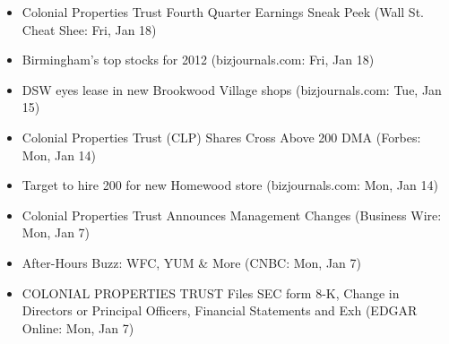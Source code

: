 \documentclass[11pt,asymmetric]{article}
\begin{document}
\begin{itemize}
\item Colonial Properties Trust Fourth Quarter Earnings Sneak Peek (Wall St. Cheat Shee: Fri, Jan 18)
\item Birmingham's top stocks for 2012 (bizjournals.com: Fri, Jan 18)
\item DSW eyes lease in new Brookwood Village shops (bizjournals.com: Tue, Jan 15)
\item Colonial Properties Trust (CLP) Shares Cross Above 200 DMA (Forbes: Mon, Jan 14)
\item Target to hire 200 for new Homewood store (bizjournals.com: Mon, Jan 14)
\item Colonial Properties Trust Announces Management Changes (Business Wire: Mon, Jan 7)
\item After-Hours Buzz: WFC, YUM \& More (CNBC: Mon, Jan 7)
\item COLONIAL PROPERTIES TRUST Files SEC form 8-K, Change in Directors or Principal Officers, Financial Statements and Exh (EDGAR Online: Mon, Jan 7)
\end{itemize}
\end{document}
